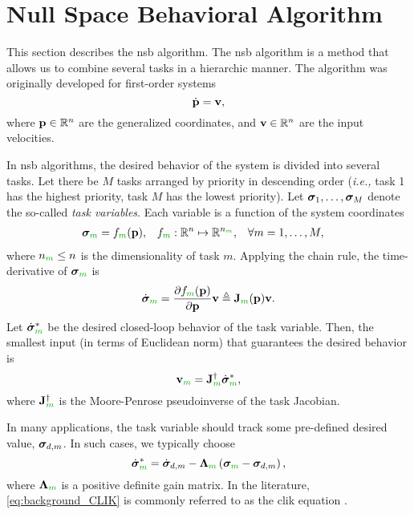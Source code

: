 \section{Null Space Behavioral Algorithm}
\label{sec:background_NSB}

This section describes the \acrfull{nsb} algorithm.
The \gls{nsb} algorithm is a method that allows us to combine several tasks in a hierarchic manner.
The algorithm was originally developed for first-order systems
\begin{equation}
    \dot{\mathbf{p}} = \mathbf{v},
\end{equation}
where $\mathbf{p} \in \mathbb{R}^n$ are the generalized coordinates, and $\mathbf{v} \in \mathbb{R}^n$ are the input velocities.

In \gls{nsb} algorithms, the desired behavior of the system is divided into several tasks.
Let there be $M$ tasks arranged by priority in descending order (\emph{i.e.,} task 1 has the highest priority, task $M$ has the lowest priority).
Let $\bm{\sigma}_1, \ldots, \bm{\sigma}_M$ denote the so-called \emph{task variables}.
Each variable is a function of the system coordinates
\begin{align}
    \bs{\sigma}_{\dm{m}} &= f_{\dm{m}}(\mat{p}), &
    f_{\dm{m}} &: \mathbb{R}^n \mapsto \mathbb{R}^{n_{\dm{m}}}, &
    &\forall m = 1, \ldots, M,
\end{align}
where $n_{\dm{m}} \leq n$ is the dimensionality of task $m$.
Applying the chain rule, the time-derivative of $\bs{\sigma}_{\dm{m}}$ is
\begin{equation}
    \dot{\bs{\sigma}}_{\dm{m}} = \frac{\partial f_{\dm{m}}(\mat{p})}{\partial \mat{p}} \ivel \triangleq \mat{J}_{\dm{m}}(\mat{p}) \ivel.
\end{equation}
Let $\dot{\bs{\sigma}}_{\dm{m}}^{*}$ be the desired closed-loop behavior of the task variable.
Then, the smallest input (in terms of Euclidean norm) that guarantees the desired behavior is
\begin{equation}
    \ivel_{\dm{m}} = \mat{J}_{\dm{m}}^{\dagger} \dot{\bs{\sigma}}_{\dm{m}}^{*},
    \label{eq:background_NSB_velocity_i}
\end{equation}
where $\mat{J}_{\dm{m}}^{\dagger}$ is the Moore-Penrose pseudoinverse of the task Jacobian.

\begin{rmk*}
    In many applications, the task variable should track some pre-defined desired value, $\bm{\sigma}_{d, m}$.
    In such cases, we typically choose
    \begin{equation}
        \dot{\bs{\sigma}}_{\dm{m}}^{*} = \dot{\bs{\sigma}}_{d, m} - \bs{\Lambda}_{\dm{m}} \left(\bs{\sigma}_{\dm{m}} - \bs{\sigma}_{d,m}\right),  
        \label{eq:background_CLIK}  
    \end{equation}
    where $\bs{\Lambda}_{\dm{m}}$ is a positive definite gain matrix.
    In the literature, \eqref{eq:background_CLIK} is commonly referred to as the \gls{clik} equation \cite{antonelli_2006_kinematic}.
\end{rmk*}

